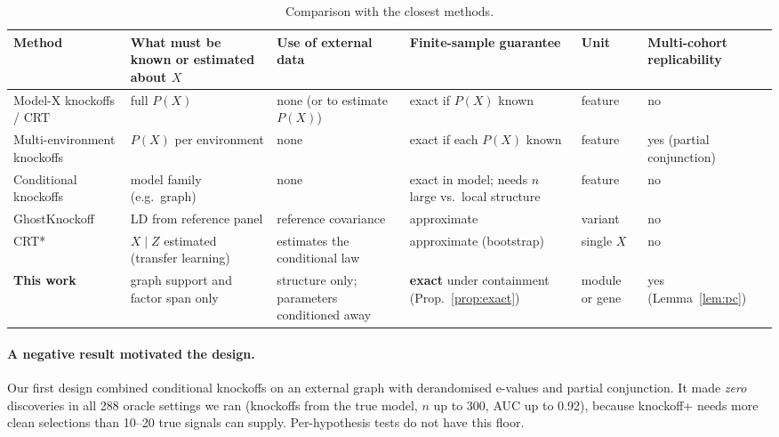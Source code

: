 \documentclass[10pt,twocolumn,letterpaper]{article}
\theoremstyle{remark}
\begin{document}
\begin{table}[t]
\centering\footnotesize
\caption{Comparison with the closest methods.}
\label{tab:related}
\begin{tabular}{p{2.6cm}p{2.7cm}p{2.9cm}p{2.6cm}p{1.6cm}p{2.2cm}}
\toprule
Method & What must be known or estimated about $X$ & Use of external data & Finite-sample guarantee & Unit & Multi-cohort replicability \\
\midrule
Model-X knockoffs / CRT \citep{candes2018panning} & full $P(X)$ & none (or to estimate $P(X)$) & exact if $P(X)$ known & feature & no \\
Multi-environment knockoffs \citep{li2022multienv} & $P(X)$ per environment & none & exact if each $P(X)$ known & feature & yes (partial conjunction) \\
Conditional knockoffs \citep{huang2020relaxing} & model family (e.g.\ graph) & none & exact in model; needs $n$ large vs.\ local structure & feature & no \\
GhostKnockoff \citep{he2022ghostknockoff} & LD from reference panel & reference covariance & approximate & variant & no \\
CRT* \citep{crtstar2026} & $X\mid Z$ estimated (transfer learning) & estimates the conditional law & approximate (bootstrap) & single $X$ & no \\
\textbf{This work} & graph support and factor span only & structure only; parameters conditioned away & \textbf{exact} under containment (Prop.~\ref{prop:exact}) & module or gene & yes (Lemma~\ref{lem:pc}) \\
\bottomrule
\end{tabular}
\end{table}

\paragraph{A negative result motivated the design.} Our first design combined conditional knockoffs on an external graph with derandomised e-values \citep{ren2024derandomised} and partial conjunction. It made \emph{zero} discoveries in all 288 oracle settings we ran (knockoffs from the true model, $n$ up to 300, AUC up to 0.92), because knockoff+ needs more clean selections than 10--20 true signals can supply. Per-hypothesis tests do not have this floor.
\end{document}
